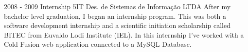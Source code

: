     {}
    {}
    {}
\cvevent
    {2008 - 2009}
    {Internship}
    {5IT Des. de Sistemas de Informação LTDA}
    {After my bachelor level graduation, I began an internship program. This was both a software development internship and a scientific initiation scholarship called BITEC from Euvaldo Lodi Institute (IEL). In this internship I’ve worked with a Cold Fusion web application connected to a MySQL Database.}
    {}
    {}
    {}
